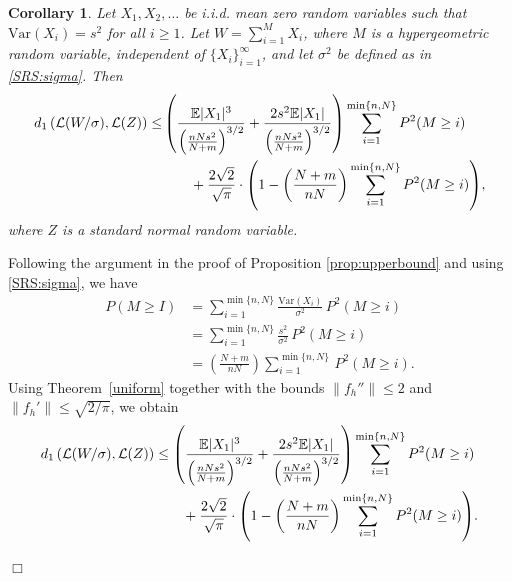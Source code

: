 \documentclass[pdflatex,sn-mathphys-ay]{sn-jnl}
\newcommand{\bbox}{\hfill $\Box$}
\newcommand{\E}{\mathbb{E}}
\newcommand{\Var}{\mathrm{Var}}
\newtheorem{corollary}[theorem]{Corollary}
\theoremstyle{thmstyleone}%
\theoremstyle{thmstyletwo}%
\theoremstyle{thmstylethree}%
\begin{document}
\begin{corollary} \label{SRM:Theoretical result} Let $X_1,X_2,\ldots$ be i.i.d. mean zero random variables such that $\Var(X_i) = s^2$ for all $i\geq 1$. Let $W=\sum_{i=1}^MX_i$, where $M$ is  a hypergeometric random variable, independent of $\{X_i\}_{i=1}^\infty$, and let $\sigma^2$ be defined as in  \eqref{SRS:sigma}. Then 
	\begin{align*} d_1\left(\mathcal{L}(W/\sigma), \mathcal{L}(Z) \right)  \le &\left({\E|X_1|^3 \over \left({nN s^2\over N+m}\right)^{3/2}} +{2s^2\E|X_1|\over \left({nNs ^2\over N+m}\right)^{3/2}}\right)\sum_{i=1}^{\min\{n,N\}} P^2(M\ge i)  \\&\quad \quad+{2\sqrt{2} \over \sqrt{\pi}}\cdot\displaystyle{\left(1- \left( \frac{N+m}{nN}\right)\sum_{i=1}^{\min\{n,N\}} P^2(M\ge i)\right)}, \end{align*}  where $Z$ is a standard normal random variable.
\end{corollary}
\proof Following the argument in the proof of Proposition \ref{prop:upperbound} and using \eqref{SRS:sigma}, we have
\begin{align*}
		P(M \ge I) &=  \sum_{i=1}^{\min\{n,N\}} \frac{\Var(X_i)}{\sigma^2} \, P^2(M \ge i)\\
		&=  \sum_{i=1}^{\min\{n,N\}} \frac{s^2}{\sigma^2} \, P^2(M \ge i)\\& =  \left( \frac{N+m}{nN}\right)\sum_{i=1}^{\min\{n,N\}} \, P^2(M \ge i).
	\end{align*} 
	Using Theorem~\ref{uniform} together with the bounds 
	$\|f_h''\| \le 2$ and $\|f_h'\| \le \sqrt{2/\pi}$, 
	we obtain \begin{align*} d_1\left(\mathcal{L}(W/\sigma), \mathcal{L}(Z) \right) & \le \left({\E|X_1|^3 \over \left({nNs^2\over N+m}\right)^{3/2}} +{2s^2\E|X_1|\over \left({nNs^2\over N+m}\right)^{3/2}}\right)\sum_{i=1}^{\min\{n,N\}} P^2(M\ge i)  \\&\quad \quad+{2\sqrt{2} \over \sqrt{\pi}}\cdot\displaystyle{\left(1- \left( \frac{N+m}{nN}\right)\sum_{i=1}^{\min\{n,N\}} P^2(M\ge i)\right)}.\end{align*}

\bbox
\end{document}
